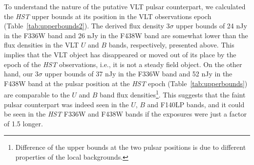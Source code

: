\documentclass[pdftex,twocolumn]{aastex62}
\newcommand{\gp}[1]{{\color{blue} #1}}
\begin{document}
To understand the nature of the putative VLT pulsar 
counterpart,  
we calculated the {\sl HST} upper bounds at its position in the VLT observations epoch
(Table~\ref{tab:upperbounds2}). 
The derived flux density 
$3\sigma$ upper bounds of 24 nJy in the F336W band and 26 
nJy in the F438W band 
are somewhat lower than the flux densities  in the VLT $U$ and $B$ bands, respectively, presented above.
This  implies that
the VLT object  has disappeared or moved out of its place 
by the epoch of the {\sl HST} observations, i.e., it is not a steady field object. 
On the other hand, our $3\sigma$ upper bounds of 37 nJy in the F336W band  and 52 nJy in the F438W band 
at the pulsar position at the {\sl HST} epoch (Table~\ref{tab:upperbounds}) are 
comparable to the $U$ and $B$ band flux densities\footnote{ Difference of the upper bounds 
at the two pulsar positions is due to different properties of the local backgrounds.}. 
This suggests that the faint pulsar counterpart  
was indeed seen in  the $U$, $B$ and F140LP bands, 
and it 
could be seen in the {\sl HST} F336W and F438W bands 
if the exposures were 
just a factor of 1.5 longer. 
\end{document}
